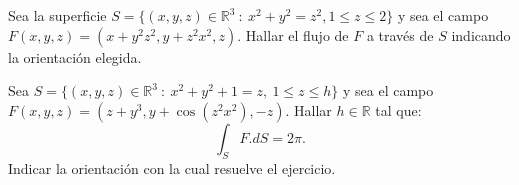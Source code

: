 \begin{tarea}
 Sea la superficie   $S=\{  (x,y,z) \in \mathbb{R}^{3} \: : \: x ^{2}+ y^{2} = z^{2}, 1 \leq z \leq 2 \}$   y   sea el campo $F(x,y,z)=(x+y^{2}z^{2}, y+z^{2}x^{2}, z).$  Hallar el flujo  de $F$ a trav\'es de $S$ indicando la orientaci\'on elegida.
\end{tarea}  



\begin{tarea}
Sea  $S=\{  (x,y,z) \in \mathbb{R}^{3} \: : \: x ^{2}+ y^{2} +1= z,  \:  1\leq z \leq h\}$  y sea  el campo $F(x,y,z)=(z+y^{3},  y+ \cos (z^{2}x^{2}),  -z).$    Hallar $h \in \mathbb{R}$ tal que: $$\int_{S} F . dS = 2\pi. $$  Indicar la orientaci\'on con la cual resuelve el ejercicio.
\end{tarea}